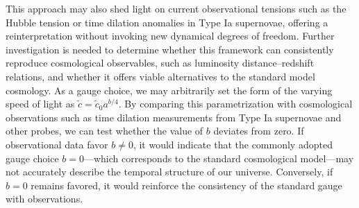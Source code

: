 \documentclass[jkps,preprint,fleqn]{revtex4} %
\newcommand{\tc}{\tilde{c}}
\begin{document}
This approach may also shed light on current observational tensions such as the Hubble tension or time dilation anomalies in Type Ia supernovae, offering a reinterpretation without invoking new dynamical degrees of freedom. Further investigation is needed to determine whether this framework can consistently reproduce cosmological observables, such as luminosity distance–redshift relations, and whether it offers viable alternatives to the standard model cosmology. As a gauge choice, we may arbitrarily set the form of the varying speed of light as $\tc = \tc_0 a^{b/4}$. By comparing this parametrization with cosmological observations such as time dilation measurements from Type Ia supernovae and other probes, we can test whether the value of $b$ deviates from zero. If observational data favor $b \neq 0$, it would indicate that the commonly adopted gauge choice $b = 0$—which corresponds to the standard cosmological model—may not accurately describe the temporal structure of our universe. Conversely, if $b = 0$ remains favored, it would reinforce the consistency of the standard gauge with observations.



\end{document}
